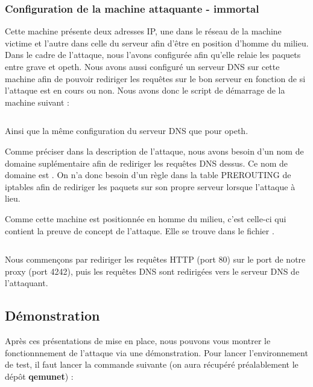 \inputminted[bgcolor=lbcolor, breaklines]{shell}{../sslstrip2/opeth/start.sh}

\subsubsection{Configuration de la machine attaquante - immortal}

Cette machine présente deux adresses IP, une dans le réseau de la machine victime et l'autre dans celle du serveur afin d'être en position d'homme du milieu. Dans le cadre de l'attaque, nous l'avons configurée afin qu'elle relaie les paquets entre grave et opeth. Nous avons aussi configuré un serveur DNS sur cette machine afin de pouvoir rediriger les requêtes sur le bon serveur en fonction de si l'attaque est en cours ou non. Nous avons donc le script de démarrage de la machine suivant :

\inputminted[bgcolor=lbcolor, breaklines]{shell}{../sslstrip2/immortal/start.sh}

Ainsi que la même configuration du serveur DNS que pour opeth.

Comme préciser dans la description de l'attaque, nous avons besoin d'un nom de domaine suplémentaire afin de rediriger les requêtes DNS dessus. Ce nom de domaine est . On n'a donc besoin d'un règle dans la table PREROUTING de iptables afin de rediriger les paquets sur son propre serveur lorsque l'attaque à lieu.

Comme cette machine est positionnée en homme du milieu, c'est celle-ci qui contient la preuve de concept de l'attaque. Elle se trouve dans le fichier .

\inputminted[bgcolor=lbcolor, breaklines]{shell}{../sslstrip2/immortal/attack.sh}

Nous commençons par rediriger les requêtes HTTP (port 80) sur le port de notre proxy (port 4242), puis les requêtes DNS sont redirigées vers le serveur DNS de l'attaquant.

\subsection{Démonstration}

Après ces présentations de mise en place, nous pouvons vous montrer le fonctionnnement de l'attaque via une démonstration. Pour lancer l'environnement de test, il faut lancer la commande suivante (on aura récupéré préalablement le dépôt \textbf{qemunet}) :

